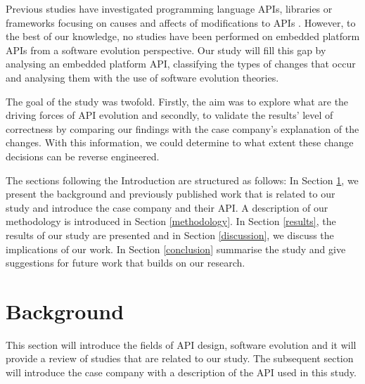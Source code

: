 \documentclass{sig-alternate}
\begin{document}
Previous studies have investigated programming language APIs, libraries or frameworks focusing on causes and affects of modifications to APIs \cite{dig2005role, hou2011exploring, shi2011empirical}. However, to the best of our knowledge, no studies have been performed on embedded platform APIs from a software evolution perspective. Our study will fill this gap by analysing an embedded platform API, classifying the types of changes that occur and analysing them with the use of software evolution theories.

The goal of the study was twofold. Firstly, the aim was to explore what are the driving forces of API evolution and secondly, to validate the results' level of correctness by comparing our findings with the case company's explanation of the changes. With this information, we could determine to what extent these change decisions can be reverse engineered. 

\newpage
The sections following the Introduction are structured as follows: In Section \ref{background}, we present the background and previously published work that is related to our study and introduce the case company and their API. A description of our methodology is introduced in Section \ref{methodology}. In Section \ref{results}, the results of our study are presented and in Section \ref{discussion}, we discuss the implications of our work. In Section \ref{conclusion} summarise the study and give suggestions for future work that builds on our research. 

\section{Background} \label{background}
This section will introduce the fields of API design, software evolution and it will provide a review of studies that are related to our study. The subsequent section will introduce the case company with a description of the API used in this study.  
\end{document}

